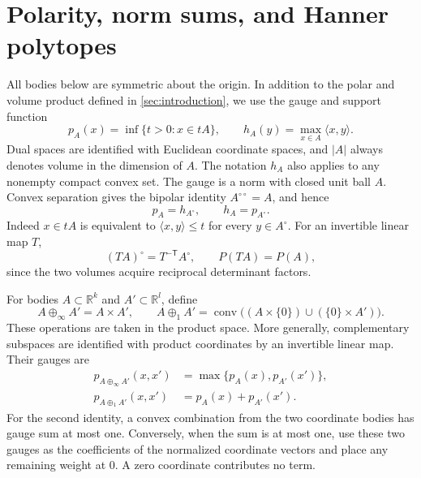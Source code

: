 \section{Polarity, norm sums, and Hanner polytopes}\label{sec:convex}

All bodies below are symmetric about the origin. In addition to the polar and volume product defined in \cref{sec:introduction}, we use the gauge and support function
\[
 p_A(x)=\inf\{t>0:x\in tA\},\qquad
 h_A(y)=\max_{x\in A}\langle x,y\rangle.
\]
Dual spaces are identified with Euclidean coordinate spaces, and $|A|$ always denotes volume in the dimension of $A$. The notation $h_A$ also applies to any nonempty compact convex set. The gauge is a norm with closed unit ball $A$. Convex separation gives the bipolar identity $A^{\circ\circ}=A$, and hence
\begin{equation}\label{eq:gauge-support}
 p_A=h_{A^\circ},\qquad h_A=p_{A^\circ}.
\end{equation}
Indeed $x\in tA$ is equivalent to $\langle x,y\rangle\le t$ for every $y\in A^\circ$. For an invertible linear map $T$,
\begin{equation}\label{eq:linear-polarity}
 (TA)^\circ=T^{-\mathsf T}A^\circ,
 \qquad P(TA)=P(A),
\end{equation}
since the two volumes acquire reciprocal determinant factors.

For bodies $A\subset\mathbb{R}^k$ and $A'\subset\mathbb{R}^l$, define
\[
 A\oplus_\infty A'=A\times A',\qquad
 A\oplus_1 A'=\operatorname{conv}
       \bigl((A\times\{0\})\cup(\{0\}\times A')\bigr).
\]
These operations are taken in the product space. More generally, complementary subspaces are identified with product coordinates by an invertible linear map. Their gauges are
\begin{equation}\label{eq:sum-gauges}
 \begin{split}
 p_{A\oplus_\infty A'}(x,x')&=\max\{p_A(x),p_{A'}(x')\},\\
 p_{A\oplus_1 A'}(x,x')&=p_A(x)+p_{A'}(x').
 \end{split}
\end{equation}
For the second identity, a convex combination from the two coordinate bodies has gauge sum at most one. Conversely, when the sum is at most one, use these two gauges as the coefficients of the normalized coordinate vectors and place any remaining weight at $0$. A zero coordinate contributes no term.

